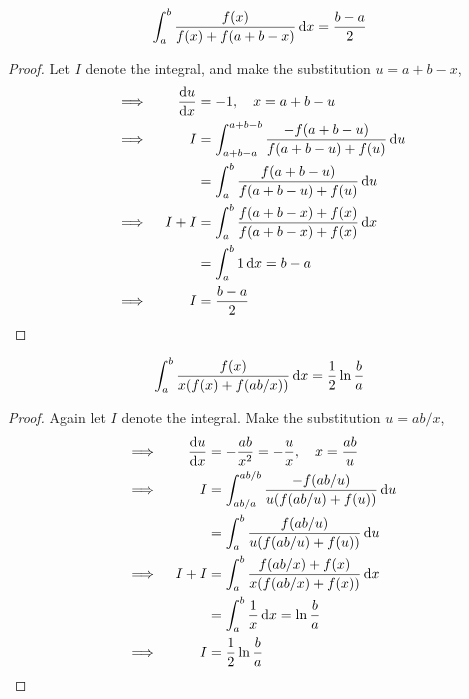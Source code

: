 \begin{theorem}
\begin{equation*}
\integ[a]<b>{\frac{f(x)}{f(x) + f(a + b - x)}}{x} = \frac{b - a} 2
\end{equation*}
\end{theorem}
\begin{proof}
Let \(I\) denote the integral, and make the substitution \(u = a + b - x\),
\begin{alignat*}{2}
    &\implies{}& \dv<u>{x} &= -1, \quad x = a + b - u \\
    &\implies{}& I &= \integ[a + b - a]<a + b - b>{
                        \frac{-f(a + b - u)}{f(a + b - u) + f(u)}}{u} \\
    &&  &= \integ[a]<b>{\frac{f(a + b - u)}{f(a + b - u) + f(u)}}{u} \\
    &\implies{}& I + I &= \integ[a]<b>{
                        \frac{f(a + b - x) + f(x)}
                            {f(a + b - x) + f(x)}}{x} \\
    &&  &= \integ[a]<b>{1}{x} = b - a \\
    &\implies{}& I &= \frac{b - a} 2 \qedhere
\end{alignat*}
\end{proof}
\begin{theorem}
\begin{equation*}
\integ[a]<b>{\frac{f(x)}{x(f(x) + f(ab / x))}}{x} = \frac 12 \ln \frac ba
\end{equation*}
\end{theorem}
\begin{proof}
Again let \(I\) denote the integral. Make the substitution \(u = ab / x\),
\begin{alignat*}{2}
    &\implies{}& \dv<u>{x} &= -\frac{ab}{x^2} = -\frac ux, \quad x = \frac{ab}u \\
    &\implies{}& I &= \integ[ab/a]<ab/b>{\frac{-f(ab / u)}{u(f(ab / u) + f(u))}
    }{u} \\
    && &= \integ[a]<b>{\frac{f(ab / u)}{u(f(ab / u) + f(u))}}{u} \\
    &\implies{}& I + I &= \integ[a]<b>{\frac{f(ab / x) + f(x)}
                                    {x(f(ab / x) + f(x))}}{x} \\
    && &= \integ[a]<b>{\frac 1x}{x} = \ln \frac ba \\
    &\implies{}& I &= \frac 12 \ln \frac ba \qedhere
\end{alignat*}
\end{proof}

